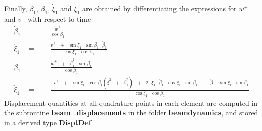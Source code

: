 Finally, $\dot{\beta}_1$, $\ddot{\beta}_1$, $\dot{\xi}_1$ and $\ddot{\xi}_1$ are obtained by differentiating the expressions for $w^+$ and $v^+$ with respect to time 
\begin{align*}
\dot{\beta}_1 \quad = \quad &\frac{\dot{w}^+ }{\cos \beta_1} \\
\dot{\xi}_1 \quad = \quad &\frac{\dot{v}^+ \textrm{ } + \textrm{ } \sin \xi_1 \textrm{ } \sin \beta_1 \textrm{ } \dot{\beta}_1}{\cos \xi_1 \textrm{ } \cos \beta_1} \\
\ddot{\beta}_1 \quad = \quad & \frac{\ddot{w}^+ \textrm{ } + \textrm{ } \dot{\beta}_1^2 \textrm{ }\sin \beta_1}{\cos \beta_1} \\
\ddot{\xi}_1 \quad = \quad &\frac{\textrm{ }\ddot{v}^{+} \textrm{ }+\textrm{ } \sin \xi_1 \textrm{ } \cos \beta_1 \left(\dot{\xi}_1^2 \textrm{ } + \textrm{ } \dot{\beta}_1^2\right) \textrm{ } + \textrm{ } 2 \textrm{ }\dot{\xi}_1 \textrm{ } \dot{\beta}_1 \textrm{ } \cos \xi_1 \textrm{ } \sin \beta_1 \textrm{ } +\textrm{ } \ddot{\beta}_1 \textrm{ }\sin \xi_1 \textrm{ } \sin \beta_1}{\cos \xi_1 \textrm{ }\cos \beta_1} 
\end{align*}
Displacement quantities at all quadrature points in each element are computed in the subroutine \textbf{beam\_displacements} in the folder \textbf{beamdynamics}, and stored in a derived type \textbf{DisptDef}.

